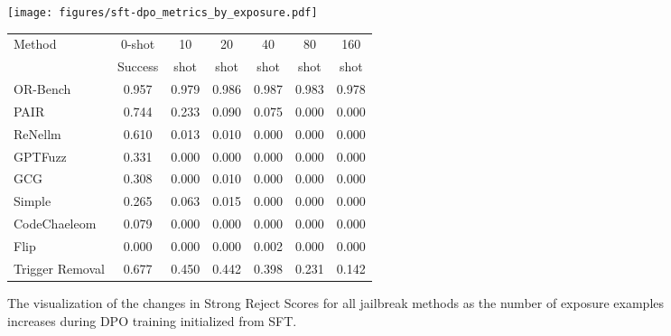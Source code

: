 \begin{figure}[h]
    \centering
    \newcommand{\LeftAdjust}{0em}
    \begin{minipage}[t]{0.49\textwidth}
    \vspace*{\LeftAdjust}
        \centering    
        \texttt{[image: figures/sft-dpo\_metrics\_by\_exposure.pdf]}
        \vspace{-2.0em}
        \caption{The visualization of the changes in Strong Reject Scores for all jailbreak methods as the number of exposure examples increases during DPO training initialized from SFT.}
        \label{fig:sft-dpo}
    \end{minipage}
    \hfill
    \newcommand{\RightAdjust}{0em}
    \begin{minipage}[t]{0.49\textwidth}
    \vspace*{\RightAdjust}
        \fontsize{8}{11}\selectfont
        \centering
        \setlength{\tabcolsep}{4pt}
        \label{tab:sft_dpo_scores}
        \vspace{-1.2em}
        \begin{tabular}{lcccccc}
        \toprule
        Method & 0-shot & 10 & 20 & 40 & 80 & 160 \\
            & Success   & shot & shot & shot & shot & shot \\
        \midrule
        OR-Bench & 0.957 & 0.979 & 0.986 & 0.987 & 0.983 & 0.978 \\
        PAIR & 0.744 & 0.233 & 0.090 & 0.075 & 0.000 & 0.000 \\
        ReNellm & 0.610 & 0.013 & 0.010 & 0.000 & 0.000 & 0.000 \\
        GPTFuzz & 0.331 & 0.000 & 0.000 & 0.000 & 0.000 & 0.000 \\
        GCG & 0.308 & 0.000 & 0.010 & 0.000 & 0.000 & 0.000 \\
        Simple & 0.265 & 0.063 & 0.015 & 0.000 & 0.000 & 0.000 \\
        CodeChaeleom & 0.079 & 0.000 & 0.000 & 0.000 & 0.000 & 0.000 \\
        Flip & 0.000 & 0.000 & 0.000 & 0.002 & 0.000 & 0.000 \\
        \midrule
        Trigger Removal & 0.677 & 0.450 & 0.442 & 0.398 & 0.231 & 0.142 \\
        \bottomrule
        \end{tabular}
    \end{minipage}
\end{figure}

